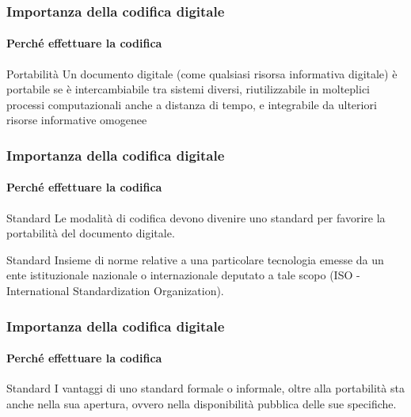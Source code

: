 

\begin{frame}
	\frametitle{Importanza della codifica digitale}
	\framesubtitle{Perché effettuare la codifica}
	\addtocounter{nframe}{1}

	\begin{block}{Portabilità}
		Un documento digitale (come qualsiasi risorsa informativa digitale) è portabile se è intercambiabile tra sistemi diversi, riutilizzabile in molteplici processi computazionali anche a distanza di tempo, e integrabile da ulteriori risorse informative omogenee
	\end{block}
\end{frame}

\begin{frame}
	\frametitle{Importanza della codifica digitale}
	\framesubtitle{Perché effettuare la codifica}
	\addtocounter{nframe}{1}

	\begin{block}{Standard}
		Le modalità di codifica devono divenire uno standard per favorire la portabilità del documento digitale.
	\end{block}

	\begin{block}{Standard}
		Insieme di norme relative a una particolare tecnologia emesse da un ente istituzionale nazionale o internazionale deputato a tale scopo (ISO - International Standardization Organization).
	\end{block}
\end{frame}


\begin{frame}
	\frametitle{Importanza della codifica digitale}
	\framesubtitle{Perché effettuare la codifica}
	\addtocounter{nframe}{1}

	\begin{block}{Standard}
		I vantaggi di uno standard formale o informale, oltre alla portabilità sta anche nella sua apertura, ovvero nella disponibilità pubblica delle sue specifiche.
	\end{block}

\end{frame}


